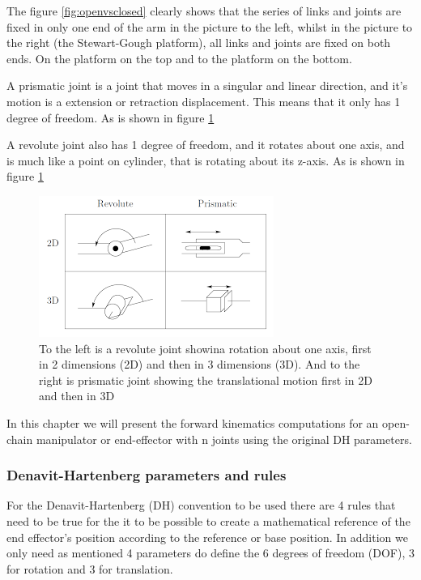 The figure \ref{fig:openvsclosed} clearly shows that the series of links and joints are fixed in only one end of the arm in the picture to the left, whilst in the picture to the right (the Stewart-Gough platform), all links and joints are fixed on both ends. On the platform on the top and to the platform on the bottom.

A prismatic joint is a joint that moves in a singular and linear direction, and it's motion is a extension or retraction displacement. This means that it only has 1 degree of freedom. As is shown in figure \ref{fig:prismatic-revolute}

A revolute joint also has 1 degree of freedom, and it rotates about one axis, and is much like a point on cylinder, that is rotating about its z-axis. As is shown in figure \ref{fig:prismatic-revolute}

\begin{figure} [H]
    \centering
    \includegraphics{Images/Task1.1&1.2/prisrevol.png}
    \caption{To the left is a revolute joint showina rotation about one axis, first in 2 dimensions (2D) and then in 3 dimensions (3D). And to the right is prismatic joint showing the translational motion first in 2D and then in 3D}
    \label{fig:prismatic-revolute}
\end{figure}

In this chapter we will present the forward kinematics computations for an open-chain manipulator or end-effector with n joints using the original DH parameters. 

\subsubsection{Denavit-Hartenberg parameters and rules}
For the Denavit-Hartenberg (DH) convention to be used there are 4 rules that need to be true for the it to be possible to create a mathematical reference of the end effector's position according to the reference or base position. In addition we only need as mentioned 4 parameters do define the 6 degrees of freedom (DOF), 3 for rotation and 3 for translation. 

